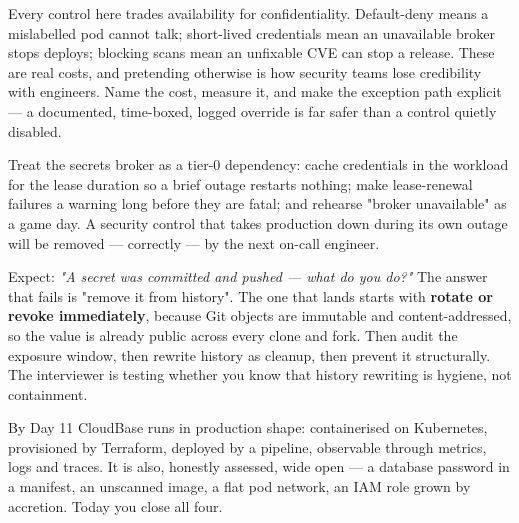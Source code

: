 \begin{tradeoff}
Every control here trades availability for confidentiality. Default-deny means a mislabelled pod cannot talk; short-lived credentials mean an unavailable broker stops deploys; blocking scans mean an unfixable CVE can stop a release. These are real costs, and pretending otherwise is how security teams lose credibility with engineers. Name the cost, measure it, and make the exception path explicit --- a documented, time-boxed, logged override is far safer than a control quietly disabled.
\end{tradeoff}

\begin{reliability}
Treat the secrets broker as a tier-0 dependency: cache credentials in the workload for the lease duration so a brief outage restarts nothing; make lease-renewal failures a warning long before they are fatal; and rehearse "broker unavailable" as a game day. A security control that takes production down during its own outage will be removed --- correctly --- by the next on-call engineer.
\end{reliability}

\begin{interview}
Expect: \emph{"A secret was committed and pushed --- what do you do?"} The answer that fails is "remove it from history". The one that lands starts with \textbf{rotate or revoke immediately}, because Git objects are immutable and content-addressed, so the value is already public across every clone and fork. Then audit the exposure window, then rewrite history as cleanup, then prevent it structurally. The interviewer is testing whether you know that history rewriting is hygiene, not containment.
\end{interview}


By Day 11 CloudBase runs in production shape: containerised on Kubernetes, provisioned by Terraform, deployed by a pipeline, observable through metrics, logs and traces. It is also, honestly assessed, wide open --- a database password in a manifest, an unscanned image, a flat pod network, an IAM role grown by accretion. Today you close all four.

